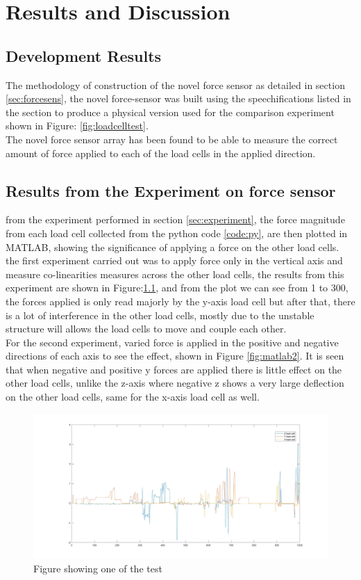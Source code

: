 \chapter{Results and Discussion}  \label{Ch:4}

\section{Development Results}
The methodology of construction of the novel force sensor as detailed in section \ref{sec:forcesens}, the novel force-sensor was built using the speechifications listed in the section to produce a physical version used for the comparison experiment shown in Figure: \ref{fig:loadcelltest}.\\
The novel force sensor array has been found to be able to measure the correct amount of force applied to each of the load cells in the applied direction.


\section{Results from the Experiment on force sensor}
from the experiment performed in section \ref{sec:experiment}, the force magnitude from each load cell collected from the python code \ref{code:py}, are then plotted in MATLAB, showing the significance of applying a force on the other load cells.\\
the first experiment carried out was to apply force only in the vertical axis and measure co-linearities measures across the other load cells, the results from this experiment are shown in Figure:\ref{fig:matlab1}, and from the plot we can see from 1 to 300, the forces applied is only read majorly by the y-axis load cell but after that, there is a lot of interference in the other load cells, mostly due to the unstable structure will allows the load cells to move and couple each other.\\
For the second experiment, varied force is applied in the positive and negative directions of each axis to see the effect, shown in Figure \ref{fig:matlab2}. It is seen that when negative and positive y forces are applied there is little effect on the other load cells, unlike the z-axis where negative z shows a very large deflection on the other load cells, same for the x-axis load cell as well.

\begin{figure}[p]%
	\centering
	\includegraphics[width=1.2\linewidth]{figures/ch4/matlabresult1}
	\caption{Figure showing one of the test}
	\label{fig:matlab1}
\end{figure}


